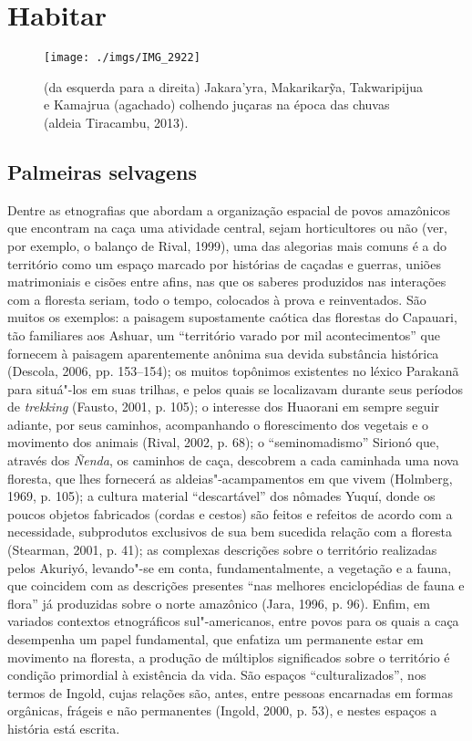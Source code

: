 
\chapter{Habitar}\label{habitar}

\begin{figure}[H]
\centering
  \texttt{[image: ./imgs/IMG\_2922]}
\caption{(da esquerda para a direita) Jakara'yra, Makarikarỹa, Takwaripijua e Kamajrua
(agachado) colhendo juçaras na época das chuvas (aldeia Tiracambu, 2013).}
\end{figure}

\section{Palmeiras selvagens}

Dentre as etnografias que abordam a organização espacial de povos
amazônicos que encontram na caça uma atividade central, sejam
horticultores ou não (ver, por exemplo, o balanço de Rival, 1999), uma
das alegorias mais comuns é a do território como um espaço marcado por
histórias de caçadas e guerras, uniões matrimoniais e cisões entre
afins, nas que os saberes produzidos nas interações com a floresta
seriam, todo o tempo, colocados à prova e reinventados. São muitos os
exemplos: a paisagem supostamente caótica das florestas do Capauari, tão
familiares aos Ashuar, um ``território varado por mil acontecimentos''
que fornecem à paisagem aparentemente anônima sua devida substância
histórica (Descola, 2006, pp. 153--154); os muitos topônimos existentes no
léxico Parakanã para situá"-los em suas trilhas, e pelos quais se
localizavam durante seus períodos de \emph{trekking} (Fausto, 2001, p.
105); o interesse dos Huaorani em sempre seguir adiante, por seus
caminhos, acompanhando o florescimento dos vegetais e o movimento dos
animais (Rival, 2002, p. 68); o ``seminomadismo'' Sirionó que, através
dos \emph{Ñenda}, os caminhos de caça, descobrem a cada caminhada uma
nova floresta, que lhes fornecerá as aldeias"-acampamentos em que vivem
(Holmberg, 1969, p. 105); a cultura material ``descartável'' dos nômades
Yuquí, donde os poucos objetos fabricados (cordas e cestos) são feitos e
refeitos de acordo com a necessidade, subprodutos exclusivos de sua bem
sucedida relação com a floresta (Stearman, 2001, p. 41); as complexas
descrições sobre o território realizadas pelos Akuriyó, levando"-se em
conta, fundamentalmente, a vegetação e a fauna, que coincidem com as
descrições presentes ``nas melhores enciclopédias de fauna e flora'' já
produzidas sobre o norte amazônico (Jara, 1996, p. 96). Enfim, em
variados contextos etnográficos sul"-americanos, entre povos para os
quais a caça desempenha um papel fundamental, que enfatiza um permanente
estar em movimento na floresta, a produção de múltiplos significados
sobre o território é condição primordial à existência da vida. São
espaços ``culturalizados'', nos termos de Ingold, cujas relações são,
antes, entre pessoas encarnadas em formas orgânicas, frágeis e não
permanentes (Ingold, 2000, p. 53), e nestes espaços a história está
escrita.

